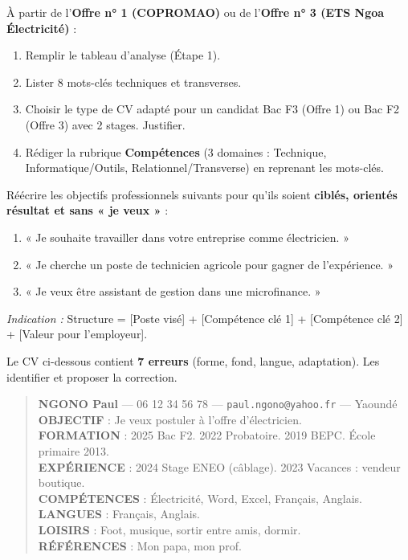 \documentclass[11pt]{article}
\begin{document}
\begin{exercice}
À partir de l'\textbf{Offre n° 1 (COPROMAO)} ou de l'\textbf{Offre n° 3 (ETS Ngoa Électricité)} :
\begin{enumerate}
\item Remplir le tableau d'analyse (Étape 1).
\item Lister 8 mots-clés techniques et transverses.
\item Choisir le type de CV adapté pour un candidat Bac F3 (Offre 1) ou Bac F2 (Offre 3) avec 2 stages. Justifier.
\item Rédiger la rubrique \textbf{Compétences} (3 domaines : Technique, Informatique/Outils, Relationnel/Transverse) en reprenant les mots-clés.
\end{enumerate}
\end{exercice}

\begin{exercice}
Réécrire les objectifs professionnels suivants pour qu'ils soient \textbf{ciblés, orientés résultat et sans « je veux »} :
\begin{enumerate}
\item « Je souhaite travailler dans votre entreprise comme électricien. »
\item « Je cherche un poste de technicien agricole pour gagner de l'expérience. »
\item « Je veux être assistant de gestion dans une microfinance. »
\end{enumerate}
\textit{Indication :} Structure = [Poste visé] + [Compétence clé 1] + [Compétence clé 2] + [Valeur pour l'employeur].
\end{exercice}

\begin{exercice}
Le CV ci-dessous contient \textbf{7 erreurs} (forme, fond, langue, adaptation). Les identifier et proposer la correction.
\begin{quote}
\textbf{NGONO Paul} — 06 12 34 56 78 — \texttt{paul.ngono@yahoo.fr} — Yaoundé \\
\textbf{OBJECTIF} : Je veux postuler à l'offre d'électricien. \\
\textbf{FORMATION} : 2025 Bac F2. 2022 Probatoire. 2019 BEPC. École primaire 2013. \\
\textbf{EXPÉRIENCE} : 2024 Stage ENEO (câblage). 2023 Vacances : vendeur boutique. \\
\textbf{COMPÉTENCES} : Électricité, Word, Excel, Français, Anglais. \\
\textbf{LANGUES} : Français, Anglais. \\
\textbf{LOISIRS} : Foot, musique, sortir entre amis, dormir. \\
\textbf{RÉFÉRENCES} : Mon papa, mon prof.
\end{quote}
\end{exercice}
\end{document}
